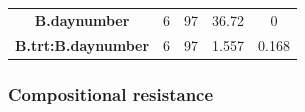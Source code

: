\documentclass[]{article}
\begin{document}
\begin{longtable}[]{@{}ccccc@{}}
\begin{minipage}[t]{0.29\columnwidth}
\textbf{B.daynumber}
\strut\end{minipage} &
\begin{minipage}[t]{0.10\columnwidth}\centering\strut
6
\strut\end{minipage} &
\begin{minipage}[t]{0.10\columnwidth}\centering\strut
97
\strut\end{minipage} &
\begin{minipage}[t]{0.12\columnwidth}\centering\strut
36.72
\strut\end{minipage} &
\begin{minipage}[t]{0.12\columnwidth}\centering\strut
0
\strut\end{minipage}\tabularnewline
\begin{minipage}[t]{0.29\columnwidth}\centering\strut
\textbf{B.trt:B.daynumber}
\strut\end{minipage} &
\begin{minipage}[t]{0.10\columnwidth}\centering\strut
6
\strut\end{minipage} &
\begin{minipage}[t]{0.10\columnwidth}\centering\strut
97
\strut\end{minipage} &
\begin{minipage}[t]{0.12\columnwidth}\centering\strut
1.557
\strut\end{minipage} &
\begin{minipage}[t]{0.12\columnwidth}\centering\strut
0.168
\strut\end{minipage}\tabularnewline
\bottomrule
\end{longtable}

\newpage

\subsubsection{Compositional resistance}\label{compositional-resistance}
\end{document}
